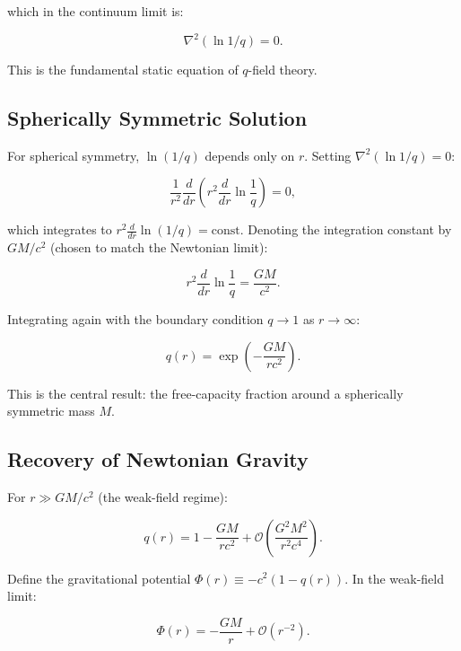 \documentclass[aps,prd,twocolumn,showpacs,superscriptaddress,preprintnumbers]{revtex4-2}
\begin{document}
which in the continuum limit is:

\begin{equation}
\boxed{\nabla^2(\ln 1/q) = 0}.
\label{eq:laplace_ln}
\end{equation}

This is the fundamental static equation of $q$-field theory.

\subsection{Spherically Symmetric Solution}

For spherical symmetry, $\ln(1/q)$ depends only on $r$.
Setting $\nabla^2(\ln 1/q)=0$:

\begin{equation}
\frac{1}{r^2}\frac{d}{dr}\left(r^2 \frac{d}{dr}\ln\frac{1}{q}\right) = 0,
\label{eq:ode}
\end{equation}

which integrates to $r^2\frac{d}{dr}\ln(1/q)=\text{const}$.
Denoting the integration constant by $GM/c^2$ (chosen to match the Newtonian limit):

\begin{equation}
r^2 \frac{d}{dr}\ln\frac{1}{q} = \frac{GM}{c^2}.
\label{eq:first_int}
\end{equation}

Integrating again with the boundary condition $q\to1$ as $r\to\infty$:

\begin{equation}
\boxed{q(r) = \exp\left(-\frac{GM}{rc^2}\right)}.
\label{eq:q_solution}
\end{equation}

This is the central result: the free-capacity fraction around a spherically symmetric mass $M$.

\subsection{Recovery of Newtonian Gravity}

For $r\gg GM/c^2$ (the weak-field regime):

\begin{equation}
q(r) = 1 - \frac{GM}{rc^2} + \mathcal{O}\left(\frac{G^2 M^2}{r^2 c^4}\right).
\label{eq:q_expand}
\end{equation}

Define the gravitational potential $\Phi(r)\equiv-c^2(1-q(r))$.
In the weak-field limit:

\begin{equation}
\boxed{\Phi(r) = -\frac{GM}{r} + \mathcal{O}(r^{-2})}.
\label{eq:newton}
\end{equation}
\end{document}
